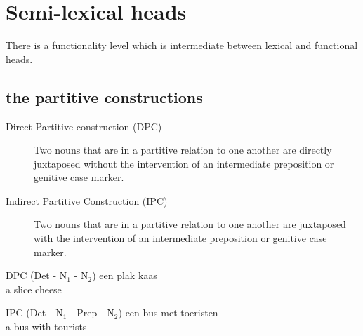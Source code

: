 \documentclass{article}
\begin{document}
\section{Semi-lexical heads}
There is a functionality level which is intermediate between lexical and functional heads. 
\subsection{the partitive constructions}
\begin{description}
\item [Direct Partitive construction (DPC)]
Two nouns that are in a partitive relation to one another are directly juxtaposed without the intervention of an intermediate preposition or genitive case marker. 
\item [Indirect Partitive Construction (IPC)]
Two nouns that are in a partitive relation to one another are juxtaposed with the intervention of an intermediate preposition or genitive case marker.
\end{description}
\begin{example}
\label{Dutch DPC}
DPC (Det - N$_{1}$ - N$_{2}$)
   \gll een plak kaas\\
a slice cheese\\

   \glt
   \glend

   \end{example}
\begin{example}
\label{Dutch IPC}
IPC (Det - N$_{1}$ - Prep - N$_{2}$)
\gll een bus met toeristen\\
 a bus with tourists\\
\glt
  \glend
\end{example}
\end{document}
